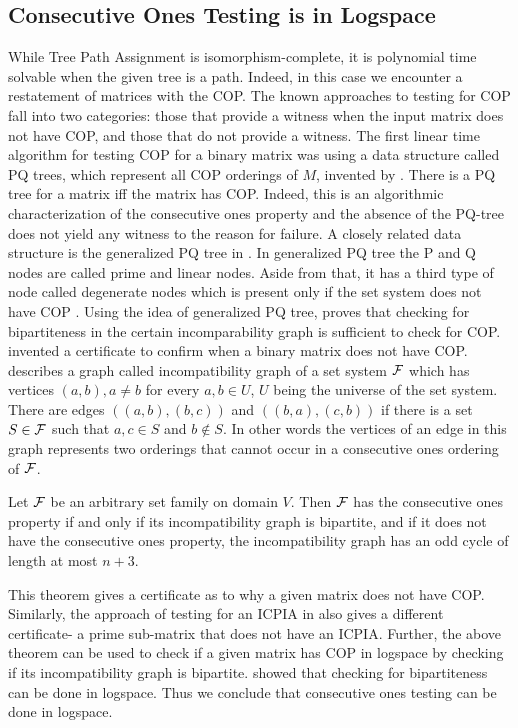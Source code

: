 \documentclass{llncs}
\def\cF{{\cal F}}
\begin{document}
\subsection{Consecutive Ones Testing is in Logspace}
While Tree Path Assignment is isomorphism-complete, it is polynomial time solvable when the given tree is a path.  
Indeed, in this case we encounter a restatement of matrices with the COP.  The known approaches to testing for COP fall into two categories: those that provide a witness when the input matrix does not have COP, and those that do not provide a witness.  
The first linear time algorithm for testing COP for a binary matrix
was using a data structure called PQ trees, which represent all COP orderings of $M$, invented by
\cite{bl76}. There is a PQ tree for a matrix iff the matrix has COP.   Indeed, this is an algorithmic characterization
of the consecutive ones property and the absence of the PQ-tree does not yield any witness to the reason for failure.
A closely related data structure is the generalized PQ tree in
\cite{mcc04}. 
In generalized PQ tree the P and Q nodes are called prime and linear
nodes. Aside from that, it has a third type of node called degenerate
nodes which is present only if the set system does not have COP \cite{mcc04}.
Using the idea of generalized PQ tree, \cite{mcc04} proves that checking for bipartiteness in
the certain incomparability graph is sufficient to check for COP. 
\cite{mcc04} invented a certificate to confirm when a binary matrix
does not have COP.   \cite{mcc04} describes a graph called incompatibility graph of a set
system $\cF$ which has
vertices $(a,b), a \ne b$ for every $a, b \in U$, $U$ being the
universe of the set system. There are edges $((a,b),(b,c))$ and $((b,a),(c,b))$
if there is a set $S \in \cF$ such that $a, c \in S$ and $b \notin
S$. In other words the vertices of an edge in this graph represents
two orderings that cannot occur in a consecutive ones ordering of $\cF$.
\begin{theorem}
  Let $\cF$ be an arbitrary set family on domain $V$. Then $\cF$ has
  the consecutive ones property if and only if its incompatibility
  graph is bipartite, and if it does not have the consecutive ones
  property, the incompatibility graph has an odd cycle of length at
  most $n+3$.
\end{theorem}
This theorem gives a certificate as to why a given matrix does not have COP.  Similarly,
the approach of testing for an ICPIA in \cite{nsnrs09} also gives a different certificate- a prime sub-matrix that does
not have an ICPIA.  Further, the above theorem can be used to check if a given matrix has COP
in logspace by checking if 
its incompatibility graph is bipartite. \cite{rei84} showed that
checking for bipartiteness can be done in logspace. Thus we conclude that consecutive ones testing
can be done in logspace.
\end{document}
